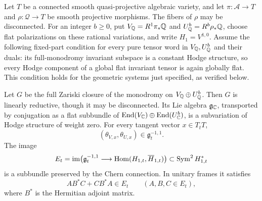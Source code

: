 \begin{lemma}
\label{var:joint-monodromy}
Let $T$ be a connected smooth quasi-projective algebraic variety, and
let $\pi:\mathcal A\to T$ and $\rho:\mathcal Q\to T$ be smooth
projective morphisms.  The fibers of $\rho$ may be disconnected.
For an integer $b\ge0$, put
$V_\mathbb Q=R^1\pi_*\mathbb Q$ and $U^b_\mathbb Q=R^b\rho_*\mathbb Q$, choose flat
polarizations on these rational variations, and write $H_1=V^{1,0}$.
Assume the following fixed-part condition for every pure tensor word
in $V_\mathbb Q,U^b_\mathbb Q$ and their duals: its full-monodromy invariant subspace
is a constant Hodge structure, so every Hodge component of a global
flat invariant tensor is again globally flat.  This condition holds
for the geometric systems just specified, as verified below.

Let $G$ be the full Zariski closure of the monodromy on
$V_\mathbb Q\oplus U^b_\mathbb Q$.  Then $G$ is linearly reductive, though it may
be disconnected.  Its Lie algebra $\mathfrak g_\mathbb C$, transported by
conjugation as a flat subbundle of
$\operatorname{End}(V_\mathbb C)\oplus\operatorname{End}(U^b_\mathbb C)$, is a subvariation of Hodge structure
of weight zero.  For every tangent vector $x\in T_tT$,
\begin{equation}
     (\theta_{V,x},\theta_{U,x})\in\mathfrak g_t^{-1,1}.
 \label{var:higgs-in-lie}
\end{equation}
The image
\begin{equation}
 E_t=\operatorname{im}\bigl(\mathfrak g_t^{-1,1}
                      \longrightarrow\operatorname{Hom}(H_{1,t},\overline H_{1,t})\bigr)
           \subset\operatorname{Sym}^2 H_{1,t}^*
 \label{var:E}
\end{equation}
is a subbundle preserved by the Chern connection.  In unitary frames it
satisfies
\begin{equation}
       A B^* C+C B^* A\in E_t\qquad(A,B,C\in E_t),
 \label{var:triple}
\end{equation}
where $B^*$ is the Hermitian adjoint matrix.
\end{lemma}

